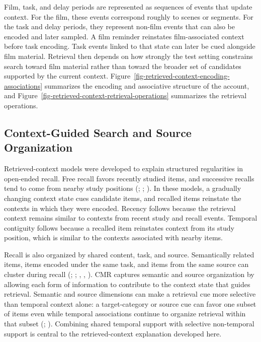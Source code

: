 \documentclass[
  man,
  floatsintext,
  longtable,
  nolmodern,
  notxfonts,
  notimes,
  draftfirst,
  colorlinks=true,linkcolor=blue,citecolor=blue,urlcolor=blue]{apa7}
\begin{document}
Film, task, and delay periods are represented as sequences of events
that update context. For the film, these events correspond roughly to
scenes or segments. For the task and delay periods, they represent
non-film events that can also be encoded and later sampled. A film
reminder reinstates film-associated context before task encoding. Task
events linked to that state can later be cued alongside film material.
Retrieval then depends on how strongly the test setting constrains
search toward film material rather than toward the broader set of
candidates supported by the current context.
Figure~\ref{fig-retrieved-context-encoding-associations} summarizes the
encoding and associative structure of the account, and
Figure~\ref{fig-retrieved-context-retrieval-operations} summarizes the
retrieval operations.

\subsection{Context-Guided Search and Source
Organization}\label{context-guided-search-and-source-organization}

Retrieved-context models were developed to explain structured
regularities in open-ended recall. Free recall favors recently studied
items, and successive recalls tend to come from nearby study positions
(;
;
). In these
models, a gradually changing context state cues candidate items, and
recalled items reinstate the contexts in which they were encoded.
Recency follows because the retrieval context remains similar to
contexts from recent study and recall events. Temporal contiguity
follows because a recalled item reinstates context from its study
position, which is similar to the contexts associated with nearby items.

Recall is also organized by shared content, task, and source.
Semantically related items, items encoded under the same task, and items
from the same source can cluster during recall
(;
;
,
,
). CMR captures semantic and source
organization by allowing each form of information to contribute to the
context state that guides retrieval. Semantic and source dimensions can
make a retrieval cue more selective than temporal context alone: a
target-category or source cue can favor one subset of items even while
temporal associations continue to organize retrieval within that subset
(;
). Combining shared
temporal support with selective non-temporal support is central to the
retrieved-context explanation developed here.
\end{document}
